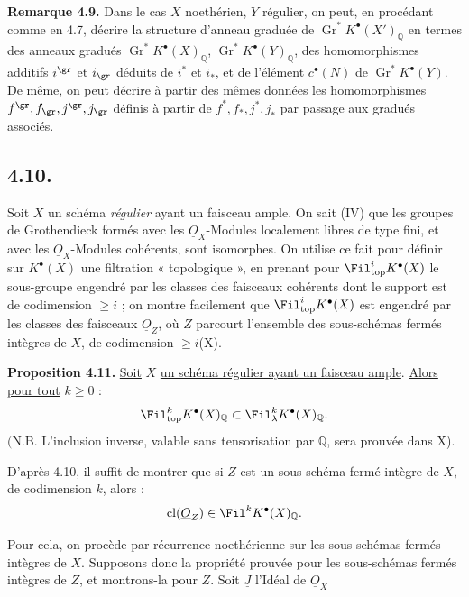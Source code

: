 
\textbf{Remarque 4.9.} Dans le cas \(X\) noethérien, \(Y\) régulier, on peut, en procédant comme en 4.7, décrire la structure d'anneau graduée de \(\operatorname{Gr}^*K^{\bullet}(X')_{\mathbb Q}\) en termes des anneaux gradués \(\operatorname{Gr}^*K^{\bullet}(X)_{\mathbb Q}\), \(\operatorname{Gr}^*K^{\bullet}(Y)_{\mathbb Q}\), des homomorphismes additifs \(i^{\gr}\) et \(i_{\gr}\) déduits de \(i^*\) et \(i_*\), et de l'élément \(c^{\bullet}(N)\) de \(\operatorname{Gr}^*K^{\bullet}(Y)\). De même, on peut décrire à partir des mêmes données les homomorphismes \(f^{\gr},f_{\gr},j^{\gr},j_{\gr}\) définis à partir de \(f^*,f_*,j^*,j_*\) par passage aux gradués associés.

\subsection*{4.10.}

Soit \(X\) un schéma \emph{régulier} ayant un faisceau ample. On sait (IV\qquad) que les groupes de Grothendieck formés avec les \(\underline{O}_X\)-Modules localement libres de type fini, et avec les \(\underline{O}_X\)-Modules cohérents, sont isomorphes. On utilise ce fait pour définir sur \(K^{\bullet}(X)\) une filtration « topologique », en prenant pour \(\Fil^i_{\mathrm{top}}K^{\bullet}(X)\) le sous-groupe engendré par les classes des faisceaux cohérents dont le support est de codimension \(\ge i\) ; on montre facilement que \(\Fil^i_{\mathrm{top}}K^{\bullet}(X)\) est engendré par les classes des faisceaux \(\underline{O}_Z\), où \(Z\) parcourt l'ensemble des sous-schémas fermés intègres de \(X\), de codimension \(\ge i\)(X\qquad).

\textbf{Proposition 4.11.} \uline{Soit} \(X\) \uline{un schéma régulier ayant un faisceau ample}. \uline{Alors} \uline{pour tout} \(k\ge0\) :
\[
  \Fil_{\mathrm{top}}^kK^{\bullet}(X)_{\mathbb Q}
  \subset
  \Fil_\lambda^kK^{\bullet}(X)_{\mathbb Q}.
\]
\((\mathrm{N.B.}\) L'inclusion inverse, valable sans tensorisation par \(\mathbb Q\), sera prouvée dans X\qquad).

D'après 4.10, il suffit de montrer que si \(Z\) est un sous-schéma fermé intègre de \(X\), de codimension \(k\), alors :
\[
  \operatorname{cl}(\underline{O}_Z)\in\Fil^kK^{\bullet}(X)_{\mathbb Q}.
\]

Pour cela, on procède par récurrence noethérienne sur les sous-schémas fermés intègres de \(X\). Supposons donc la propriété prouvée pour les sous-schémas fermés intègres de \(Z\), et montrons-la pour \(Z\). Soit \(\underline{J}\) l'Idéal de \(\underline{O}_X\)
